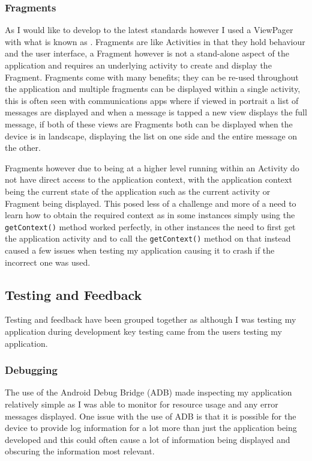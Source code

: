 \subsubsection{Fragments}\label{fragments}

As I would like to develop to the latest standards however I used a
ViewPager with what is known as \cite{fragment}. Fragments are like
Activities in that they hold behaviour and the user interface, a
Fragment however is not a stand-alone aspect of the application and
requires an underlying activity to create and display the Fragment.
Fragments come with many benefits; they can be re-used throughout the
application and multiple fragments can be displayed within a single
activity, this is often seen with communications apps where if viewed in
portrait a list of messages are displayed and when a message is tapped a
new view displays the full message, if both of these views are Fragments
both can be displayed when the device is in landscape, displaying the
list on one side and the entire message on the other.

Fragments however due to being at a higher level running within an
Activity do not have direct access to the application context, with the
application context being the current state of the application such as
the current activity or Fragment being displayed. This posed less of a
challenge and more of a need to learn how to obtain the required context
as in some instances simply using the \lstinline!getContext()! method
worked perfectly, in other instances the need to first get the
application activity and to call the \lstinline!getContext()! method on
that instead caused a few issues when testing my application causing it
to crash if the incorrect one was used.

\subsection{Testing and Feedback}\label{testing-and-feedback}

Testing and feedback have been grouped together as although I was
testing my application during development key testing came from the
users testing my application.

\subsubsection{Debugging}\label{debugging}

The use of the Android Debug Bridge (ADB) \parencite{adb} made
inspecting my application relatively simple as I was able to monitor for
resource usage and any error messages displayed. One issue with the use
of ADB is that it is possible for the device to provide log information
for a lot more than just the application being developed and this could
often cause a lot of information being displayed and obscuring the
information most relevant.


